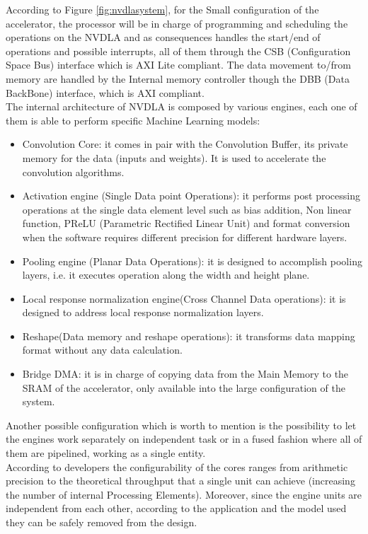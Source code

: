 According to Figure \ref{fig:nvdlasystem}, for the Small configuration of the accelerator, the processor will be in charge of programming and scheduling the operations on the NVDLA and as consequences handles the start/end of operations and possible interrupts, all of them through the CSB (Configuration Space Bus) interface which is AXI Lite compliant\cite{paper:30}. \newline
The data movement to/from memory are handled by the Internal memory controller though the DBB (Data BackBone) interface, which is AXI \cite{paper:30} compliant.\\

The internal architecture of NVDLA is composed by various engines, each one of them is able to perform specific Machine Learning models:
\begin{itemize}
\item Convolution Core: it comes in pair with the Convolution Buffer, its private memory for the data (inputs and weights). It is used to accelerate the convolution algorithms.
\item Activation engine (Single Data point Operations): it performs post processing operations at the single data element level such as bias addition, Non linear function, PReLU (Parametric Rectified Linear Unit) and format conversion when the software requires different precision for different hardware layers.
\item Pooling engine (Planar Data Operations): it is designed to accomplish pooling layers, i.e. it executes operation along the width and height plane.
\item Local response normalization engine(Cross Channel Data operations): it is designed to address local response normalization layers.
\item Reshape(Data memory and reshape operations): it transforms data mapping format without any data calculation.
\item Bridge DMA: it is in charge of copying data from the Main Memory to the SRAM of the accelerator, only available into the large configuration of the system.
\end{itemize}
Another possible configuration which is worth to mention is the possibility to let the engines work separately on independent task or in a fused fashion where all of them are pipelined, working as a single entity.\\

According to developers the configurability of the cores ranges from arithmetic precision to the theoretical throughput that a single unit can achieve (increasing the number of internal Processing Elements). Moreover, since the engine units are independent from each other, according to the application and the model used they can be safely removed from the design.
\newpage
